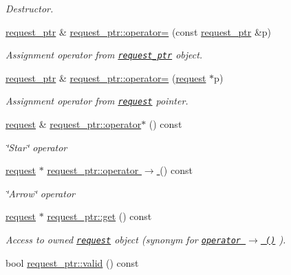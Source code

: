 \begin{CompactItemize}
\begin{CompactList}\small\item\em Destructor. \item\end{CompactList}\item 
\hyperlink{classrequest__ptr}{request\_\-ptr} \& \hyperlink{group__iolayer_g1f361f479f69ffb179ec4b54615aa1b5}{request\_\-ptr::operator=} (const \hyperlink{classrequest__ptr}{request\_\-ptr} \&p)
\begin{CompactList}\small\item\em Assignment operator from {\tt \hyperlink{classrequest__ptr}{request\_\-ptr}} object. \item\end{CompactList}\item 
\hyperlink{classrequest__ptr}{request\_\-ptr} \& \hyperlink{group__iolayer_gfef634a7f244626b88ccfb71f93060e8}{request\_\-ptr::operator=} (\hyperlink{classrequest}{request} $\ast$p)
\begin{CompactList}\small\item\em Assignment operator from {\tt \hyperlink{classrequest}{request}} pointer. \item\end{CompactList}\item 
\hyperlink{classrequest}{request} \& \hyperlink{group__iolayer_g15bd551f80acd18f2d0e3a1aade2b40c}{request\_\-ptr::operator$\ast$} () const 
\begin{CompactList}\small\item\em \char`\"{}Star\char`\"{} operator \item\end{CompactList}\item 
\hyperlink{classrequest}{request} $\ast$ \hyperlink{group__iolayer_g9ccc7167eaa30948950571a094b9c902}{request\_\-ptr::operator $\rightarrow$ } () const 
\begin{CompactList}\small\item\em \char`\"{}Arrow\char`\"{} operator \item\end{CompactList}\item 
\hyperlink{classrequest}{request} $\ast$ \hyperlink{group__iolayer_g30490f3d014bae40a66022640fb34153}{request\_\-ptr::get} () const 
\begin{CompactList}\small\item\em Access to owned {\tt \hyperlink{classrequest}{request}} object (synonym for {\tt \hyperlink{group__iolayer_g9ccc7167eaa30948950571a094b9c902}{operator $\rightarrow$ ()}} ). \item\end{CompactList}\item 
\hypertarget{group__iolayer_g848a2fc2a409c2d22bd8a91dd22aebba}{
bool \hyperlink{group__iolayer_g848a2fc2a409c2d22bd8a91dd22aebba}{request\_\-ptr::valid} () const }
\label{group__iolayer_g848a2fc2a409c2d22bd8a91dd22aebba}


\end{CompactItemize}
